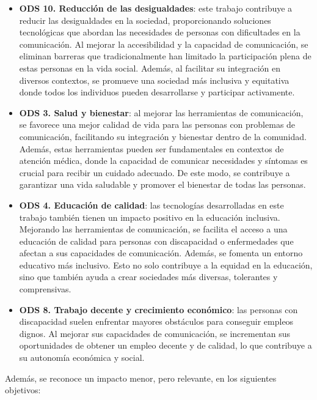 \documentclass[11pt]{article}
\begin{document}
\begin{itemize}
	\item \textbf{ODS 10. Reducción de las desigualdades}: este trabajo contribuye a reducir las desigualdades en la sociedad, proporcionando soluciones tecnológicas que abordan las necesidades de personas con dificultades en la comunicación. Al mejorar la accesibilidad y la capacidad de comunicación, se eliminan barreras que tradicionalmente han limitado la participación plena de estas personas en la vida social. Además, al facilitar su integración en diversos contextos, se promueve una sociedad más inclusiva y equitativa donde todos los individuos pueden desarrollarse y participar activamente.
	\item \textbf{ODS 3. Salud y bienestar}: al mejorar las herramientas de comunicación, se favorece una mejor calidad de vida para las personas con problemas de comunicación, facilitando su integración y bienestar dentro de la comunidad. Además, estas herramientas pueden ser fundamentales en contextos de atención médica, donde la capacidad de comunicar necesidades y síntomas es crucial para recibir un cuidado adecuado. De este modo, se contribuye a garantizar una vida saludable y promover el bienestar de todas las personas.
	\item \textbf{ODS 4. Educación de calidad}: las tecnologías desarrolladas en este trabajo también tienen un impacto positivo en la educación inclusiva. Mejorando las herramientas de comunicación, se facilita el acceso a una educación de calidad para personas con discapacidad o enfermedades que afectan a sus capacidades de comunicación. Además, se fomenta un entorno educativo más inclusivo. Esto no solo contribuye a la equidad en la educación, sino que también ayuda a crear sociedades más diversas, tolerantes y comprensivas.
	\item \textbf{ODS 8. Trabajo decente y crecimiento económico}: las personas con discapacidad suelen enfrentar mayores obstáculos para conseguir empleos dignos. Al mejorar sus capacidades de comunicación, se incrementan sus oportunidades de obtener un empleo decente y de calidad, lo que contribuye a su autonomía económica y social.
\end{itemize}

Además, se reconoce un impacto menor, pero relevante, en los siguientes objetivos:
\end{document}
